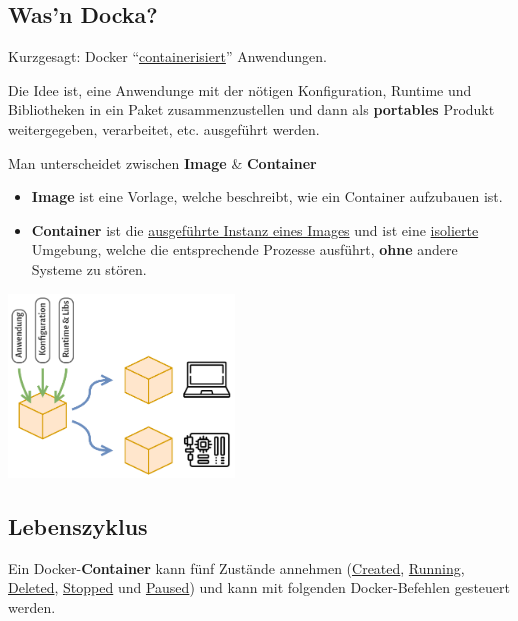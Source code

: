 \documentclass[
  10pt,
  a4paper,
  twocolumn]{article}
\providecommand{\tightlist}{%
  \setlength{\itemsep}{0pt}\setlength{\parskip}{0pt}}\usepackage{longtable,booktabs,array}
\begin{document}
\subsection{Was'n Docka?}\label{wasn-docka}

Kurzgesagt: Docker ``\ul{containerisiert}'' Anwendungen.

Die Idee ist, eine Anwendunge mit der nötigen Konfiguration, Runtime und
Bibliotheken in ein Paket zusammenzustellen und dann als
\textbf{portables} Produkt weitergegeben, verarbeitet, etc. ausgeführt
werden.

Man unterscheidet zwischen \textbf{Image} \& \textbf{Container}

\begin{itemize}
\tightlist
\item
  \textbf{Image} ist eine Vorlage, welche beschreibt, wie ein Container
  aufzubauen ist.
\item
  \textbf{Container} ist die \ul{ausgeführte Instanz eines Images} und
  ist eine \ul{isolierte} Umgebung, welche die entsprechende Prozesse
  ausführt, \textbf{ohne} andere Systeme zu stören.
\end{itemize}

\begin{center}
\includegraphics[width=6cm,height=\textheight]{./images/docker/container-distribution.png}
\end{center}

\subsection{Lebenszyklus}\label{lebenszyklus}

Ein Docker-\textbf{Container} kann fünf Zustände annehmen (\ul{Created},
\ul{Running}, \ul{Deleted}, \ul{Stopped} und \ul{Paused}) und kann mit
folgenden Docker-Befehlen gesteuert werden.
\end{document}
